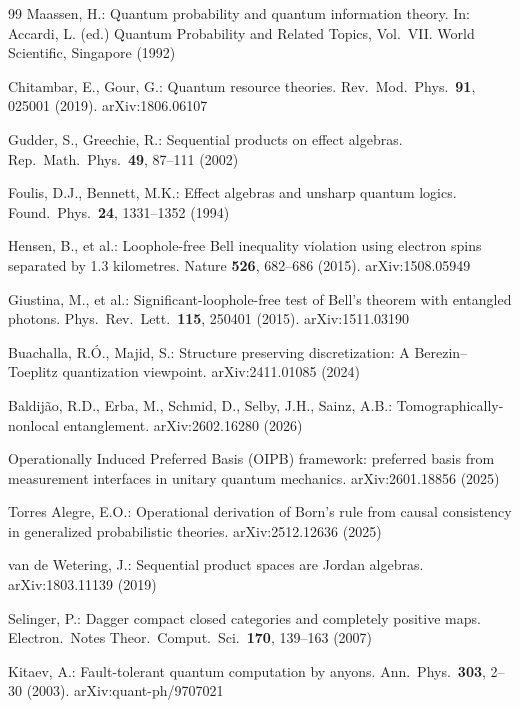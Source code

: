 \documentclass[11pt]{article}
\theoremstyle{remark}
\begin{document}
\begin{thebibliography}{99}
 Maassen, H.: Quantum probability and quantum information theory. In: Accardi, L. (ed.) Quantum Probability and Related Topics, Vol.\ VII. World Scientific, Singapore (1992)

 Chitambar, E., Gour, G.: Quantum resource theories. Rev.\ Mod.\ Phys.\ \textbf{91}, 025001 (2019). arXiv:1806.06107

 Gudder, S., Greechie, R.: Sequential products on effect algebras. Rep.\ Math.\ Phys.\ \textbf{49}, 87--111 (2002)

 Foulis, D.J., Bennett, M.K.: Effect algebras and unsharp quantum logics. Found.\ Phys.\ \textbf{24}, 1331--1352 (1994)

 Hensen, B., et al.: Loophole-free Bell inequality violation using electron spins separated by 1.3 kilometres. Nature \textbf{526}, 682--686 (2015). arXiv:1508.05949

 Giustina, M., et al.: Significant-loophole-free test of Bell's theorem with entangled photons. Phys.\ Rev.\ Lett.\ \textbf{115}, 250401 (2015). arXiv:1511.03190

 Buachalla, R.\'O., Majid, S.: Structure preserving discretization: A Berezin--Toeplitz quantization viewpoint. arXiv:2411.01085 (2024)

 Baldij\~ao, R.D., Erba, M., Schmid, D., Selby, J.H., Sainz, A.B.: Tomographically-nonlocal entanglement. arXiv:2602.16280 (2026)

 Operationally Induced Preferred Basis (OIPB) framework: preferred basis from measurement interfaces in unitary quantum mechanics. arXiv:2601.18856 (2025)

 Torres Alegre, E.O.: Operational derivation of Born's rule from causal consistency in generalized probabilistic theories. arXiv:2512.12636 (2025)

 van de Wetering, J.: Sequential product spaces are Jordan algebras. arXiv:1803.11139 (2019)

 Selinger, P.: Dagger compact closed categories and completely positive maps. Electron.\ Notes Theor.\ Comput.\ Sci.\ \textbf{170}, 139--163 (2007)

 Kitaev, A.: Fault-tolerant quantum computation by anyons. Ann.\ Phys.\ \textbf{303}, 2--30 (2003). arXiv:quant-ph/9707021


\end{thebibliography}
\end{document}
